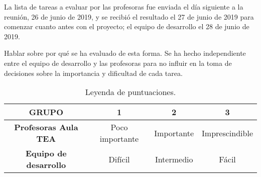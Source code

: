 	La lista de tareas a evaluar por las profesoras fue enviada el d\'ia siguiente a la reuni\'on, 26 de junio de 2019, y se recibi\'o el resultado el 27 de junio de 2019 para comenzar cuanto antes con el proyecto; el equipo de desarrollo el 28 de junio de 2019.

	Hablar sobre por qu\'e se ha evaluado de esta forma.
Se ha hecho independiente entre el equipo de desarrollo y las profesoras para no influir en la toma de decisiones sobre la importancia y dificultad de cada tarea.

\begin{table}
\centering
\begin{tabular}{| c | c | c | c |}
\hline
	\textbf{GRUPO} & \textbf{1} & \textbf{2} & \textbf{3} \\ \hline
	\textbf{Profesoras Aula TEA} & Poco importante & Importante & Imprescindible \\ \hline
	\textbf{Equipo de desarrollo} & Dif\'icil & Intermedio & F\'acil \\ \hline
\end{tabular}
\caption{Leyenda de puntuaciones.}
\end{table}

\begin{table}
\centering
{}
\caption{Puntuaci\'on de los requisitos de adaptaci\'on de temario.}
\end{table}


